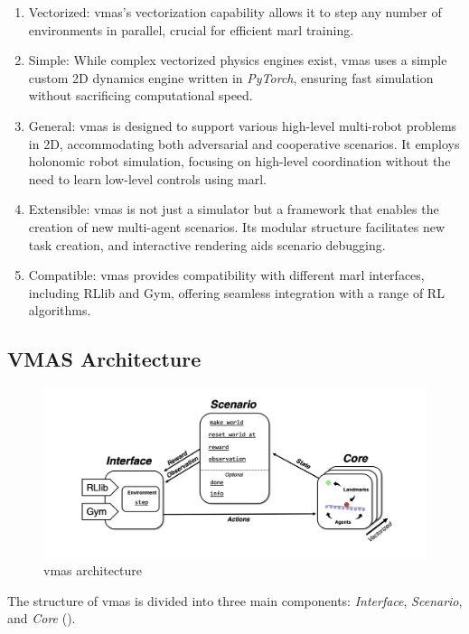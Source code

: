 \documentclass[12pt,a4paper,openright,twoside]{book}
\begin{document}
\begin{enumerate}
    \item Vectorized: \ac{vmas}'s vectorization capability allows it to step any number of environments in parallel, crucial for efficient \ac{marl} training.
    \item Simple: While complex vectorized physics engines exist, \ac{vmas} uses a simple custom 2D dynamics engine written in \emph{PyTorch}, ensuring fast simulation without sacrificing computational speed.
    \item General: \ac{vmas} is designed to support various high-level multi-robot problems in 2D, accommodating both adversarial and cooperative scenarios. It employs holonomic robot simulation, focusing on high-level coordination without the need to learn low-level controls using \ac{marl}.
    \item Extensible: \ac{vmas} is not just a simulator but a framework that enables the creation of new multi-agent scenarios. Its modular structure facilitates new task creation, and interactive rendering aids scenario debugging.
    \item Compatible: \ac{vmas} provides compatibility with different \ac{marl} interfaces, including RLlib and Gym, offering seamless integration with a range of RL algorithms.
\end{enumerate}


\subsection{VMAS Architecture}
\begin{figure}[t]
    \centering
    \includegraphics[width=\textwidth]{img/vmasstructure.png}
    \caption{\ac{vmas} architecture}
    \label{fig:v}
\end{figure}
The structure of \ac{vmas} is divided into three main components: \emph{Interface}, \emph{Scenario}, and \emph{Core} ().
\end{document}
